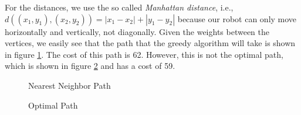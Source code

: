 For the distances, we use the so called \textit{Manhattan distance}, i.e.,\ \\ $d((x_1,y_1),(x_2,y_2)) = |x_1 - x_2| +| y_1 - y_2|$ because our robot can only move horizontally and vertically, not diagonally. Given the weights between the vertices, we easily see that the path that the greedy algorithm will take is shown in figure \ref{fig:pathOnComplete}. The cost of this path is 62. However, this is not the optimal path, which is shown in figure \ref{fig:optcompleteGraph} and has a cost of 59.

\begin{figure}
\centering
{}
\caption{Nearest Neighbor Path}
\label{fig:pathOnComplete}
\end{figure}


\begin{figure}
\centering
{}
\caption{Optimal Path}
\label{fig:optcompleteGraph}
\end{figure}


